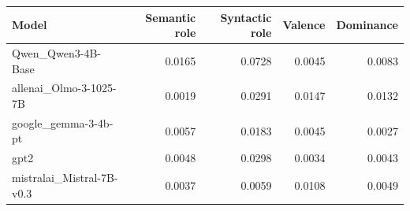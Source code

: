 \begin{tabular}{lrrrr}
\toprule
Model & Semantic role & Syntactic role & Valence & Dominance \\
\midrule
Qwen_Qwen3-4B-Base & 0.0165 & 0.0728 & 0.0045 & 0.0083 \\
allenai_Olmo-3-1025-7B & 0.0019 & 0.0291 & 0.0147 & 0.0132 \\
google_gemma-3-4b-pt & 0.0057 & 0.0183 & 0.0045 & 0.0027 \\
gpt2 & 0.0048 & 0.0298 & 0.0034 & 0.0043 \\
mistralai_Mistral-7B-v0.3 & 0.0037 & 0.0059 & 0.0108 & 0.0049 \\
\bottomrule
\end{tabular}
